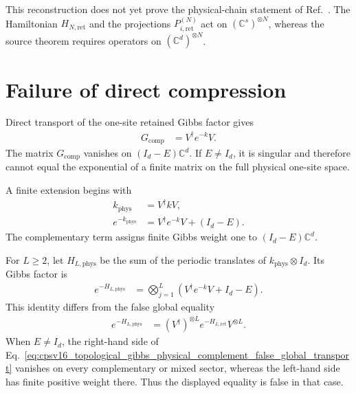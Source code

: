 \documentclass{article}
\begin{document}
This reconstruction does not yet prove the physical-chain statement of
Ref.~\cite[lines~1013--1016]{Cirac2016MPDO_arXiv}. The Hamiltonian
$H_{N,\mathrm{ret}}$ and the projections
$P_{i,\mathrm{ret}}^{(N)}$ act on $(\mathbb C^s)^{\otimes N}$, whereas the
source theorem requires operators on $(\mathbb C^d)^{\otimes N}$.

\section{Failure of direct compression}

Direct transport of the one-site retained Gibbs factor gives
\begin{align}
    G_{\mathrm{comp}}
        &= V^\dagger e^{-k}V.
    \label{eq:cpsv16_topological_gibbs_physical_complement_direct_compression}
\end{align}
The matrix $G_{\mathrm{comp}}$ vanishes on $(I_d-E)\mathbb C^d$. If
$E\neq I_d$, it is singular and therefore cannot equal the exponential of a
finite matrix on the full physical one-site space.

A finite extension begins with
\begin{align}
    k_{\mathrm{phys}}
        &= V^\dagger kV,
    \label{eq:cpsv16_topological_gibbs_physical_complement_physical_energy}\\
    e^{-k_{\mathrm{phys}}}
        &= V^\dagger e^{-k}V+(I_d-E).
    \label{eq:cpsv16_topological_gibbs_physical_complement_physical_gibbs_factor}
\end{align}
The complementary term assigns finite Gibbs weight one to
$(I_d-E)\mathbb C^d$.

For $L\geq2$, let $H_{L,\mathrm{phys}}$ be the sum of the periodic translates
of $k_{\mathrm{phys}}\otimes I_d$. Its Gibbs factor is
\begin{align}
    e^{-H_{L,\mathrm{phys}}}
        &= \bigotimes_{j=1}^{L}
           \left(V^\dagger e^{-k}V+I_d-E\right).
    \label{eq:cpsv16_topological_gibbs_physical_complement_physical_chain_extension}
\end{align}
This identity differs from the false global equality
\begin{align}
    e^{-H_{L,\mathrm{phys}}}
        &=
        (V^\dagger)^{\otimes L}
        e^{-H_{L,\mathrm{ret}}}
        V^{\otimes L}.
    \label{eq:cpsv16_topological_gibbs_physical_complement_false_global_transport}
\end{align}
When $E\neq I_d$, the right-hand side of
Eq.~\ref{eq:cpsv16_topological_gibbs_physical_complement_false_global_transport}
vanishes on every complementary or mixed sector, whereas the left-hand side
has finite positive weight there. Thus the displayed equality is false in
that case.
\end{document}
